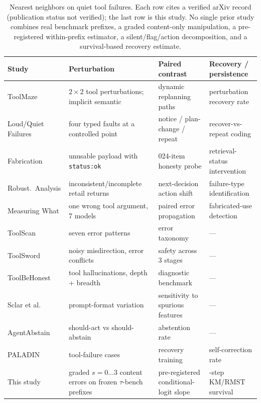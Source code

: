 \documentclass[a4paper,fleqn]{cas-sc}
\begin{document}
\begin{table}[pos=htbp]
  \centering
  \caption{Nearest neighbors on quiet tool failures. Each row cites a verified
  arXiv record (publication status not verified); the last row is this study.
  No single prior study combines real benchmark prefixes, a graded
  content-only manipulation, a pre-registered within-prefix estimator, a
  silent/flag/action decomposition, and a survival-based recovery estimate.}
  \label{tab:neighbors}
  \footnotesize
  \setlength{\tabcolsep}{3pt}
  \begin{tabular}{>{\raggedright\arraybackslash}p{2.6cm}>{\raggedright\arraybackslash}p{4.4cm}>{\raggedright\arraybackslash}p{4.4cm}>{\raggedright\arraybackslash}p{3.4cm}}
    \toprule
    \textbf{Study} & \textbf{Perturbation} & \textbf{Paired contrast} & \textbf{Recovery / persistence} \\
    \midrule
    ToolMaze \cite{toolmaze} & $2\times2$ tool perturbations; implicit semantic & dynamic replanning paths & perturbation recovery rate \\
    Loud/Quiet Failures \cite{loudfailures} & four typed faults at a controlled point & notice / plan-change / repeat & recover-vs-repeat coding \\
    Fabrication \cite{fabrication} & unusable payload with \texttt{status:ok} & 1{,}024-item honesty probe & retrieval-status intervention \\
    Robust.\ Analysis \cite{robustagents} & inconsistent/incomplete retail returns & next-decision action shift & failure-type identification \\
    Measuring What \cite{measuringwhat} & one wrong tool argument, 7 models & paired error propagation & fabricated-use detection \\
    ToolScan \cite{toolscan} & seven error patterns & error taxonomy & --- \\
    ToolSword \cite{toolsword} & noisy misdirection, error conflicts & safety across 3 stages & --- \\
    ToolBeHonest \cite{toolbehonest} & tool hallucinations, depth + breadth & diagnostic benchmark & --- \\
    Sclar et al.\ \cite{sclar} & prompt-format variation & sensitivity to spurious features & --- \\
    AgentAbstain \cite{agentabstain} & should-act vs should-abstain & abstention rate & --- \\
    PALADIN \cite{paladin} & tool-failure cases & recovery training & self-correction rate \\
    \midrule
    This study & graded $s=0\ldots3$ content errors on frozen $\tau$-bench prefixes & pre-registered conditional-logit slope & 4-step KM/RMST survival \\
    \bottomrule
  \end{tabular}
\end{table}
\end{document}

